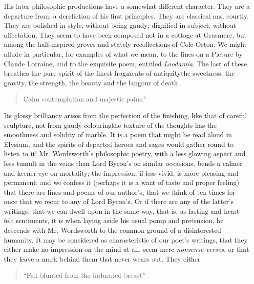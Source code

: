 His later philosophic productions have a somewhat different
character.  They are a departure from, a dereliction of his first
principles. They are classical and courtly. They are polished in
style, without being gaudy; dignified in subject, without
affectation. They seem to have been composed not in a cottage at
Grasmere, but among the half-inspired groves and stately
recollections of Cole-Orton. We might allude in particular, for
examples of what we mean, to the lines on a Picture by Claude
Lorraine, and to the exquisite poem, entitled \emph{Laodamia}. The
last of these breathes the pure spirit of the finest fragments of
antiquity\textemdash the sweetness, the gravity, the strength, the
beauty and the langour of death\textemdash
\begin{verse} Calm contemplation and majestic
pains.''
\end{verse} Its glossy brilliancy arises from the perfection of
the finishing, like that of careful sculpture, not from gaudy
colouring\textemdash the texture of the thoughts has the
smoothness and solidity of marble. It is a poem that might be read
aloud in Elysium, and the spirits of departed heroes and sages
would gather round to listen to it! Mr. Wordsworth's philosophic
poetry, with a less glowing aspect and less tumult in the veins
than Lord Byron's on similar occasions, bends a calmer and keener
eye on mortality; the impression, if less vivid, is more pleasing
and permanent; and we confess it (perhaps it is a want of taste
and proper feeling) that there are lines and poems of our
author's, that we think of ten times for once that we recur to any
of Lord Byron's. Or if there are any of the latter's writings,
that we can dwell upon in the same way, that is, as lasting and
heart-felt sentiments, it is when laying aside his usual pomp and
pretension, he descends with Mr. Wordsworth to the common ground
of a disinterested humanity. It may be considered as
characteristic of our poet's writings, that they either make no
impression on the mind at all, seem mere \emph{nonsense-verses},
or that they leave a mark behind them that never wears out. They
either
\begin{quote} ``Fall blunted from the indurated
breast''\textemdash
\end{quote} 
